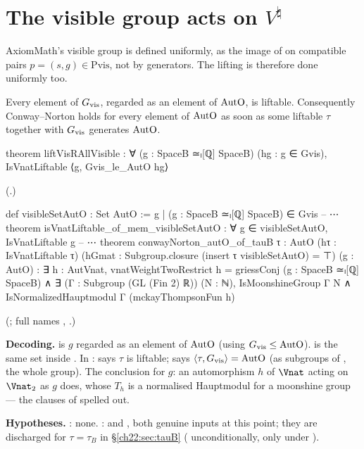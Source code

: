 \section{The visible group acts on \texorpdfstring{$V^\natural$}{V-natural}}\label{ch22:sec:visible}

AxiomMath's visible group is defined uniformly, as the image of  on compatible pairs
$p=(s,g)\in\mathrm{Pvis}$, not by generators.  The lifting is therefore done uniformly too.

\begin{theorem}\label{ch22:thm:visible}
Every element of $G_{\mathrm{vis}}$, regarded as an element of $\mathrm{AutO}$, is liftable.  Consequently
Conway--Norton holds for every element of $\mathrm{AutO}$ as soon as some liftable $\tau$ together with
$G_{\mathrm{vis}}$ generates $\mathrm{AutO}$.
\end{theorem}
\begin{leancode}
theorem liftVisRAllVisible : ∀ (g : SpaceB ≃ₗ[ℚ] SpaceB) (hg : g ∈ Gvis),
    IsVnatLiftable ⟨g, Gvis_le_AutO hg⟩
\end{leancode}
(.)
\begin{leancode}
def visibleSetAutO : Set AutO := {g | (g : SpaceB ≃ₗ[ℚ] SpaceB) ∈ Gvis}
-- ⋯
theorem isVnatLiftable_of_mem_visibleSetAutO : ∀ g ∈ visibleSetAutO, IsVnatLiftable g
-- ⋯
theorem conwayNorton_autO_of_tauB {τ : AutO} (hτ : IsVnatLiftable τ)
    (hGmat : Subgroup.closure (insert τ visibleSetAutO) = ⊤) (g : AutO) :
    ∃ h : AutVnat, vnatWeightTwoRestrict h = griessConj (g : SpaceB ≃ₗ[ℚ] SpaceB) ∧
      ∃ (Γ : Subgroup (GL (Fin 2) ℝ)) (N : ℕ), IsMoonshineGroup Γ N ∧
        IsNormalizedHauptmodul Γ (mckayThompsonFun h)
\end{leancode}
(; full names ,
.)
\begin{dictionary}
\textbf{Decoding.}   is $g$ regarded as an element of $\mathrm{AutO}$ (using
$G_{\mathrm{vis}}\le\mathrm{AutO}$).   is the same set inside .  In
:  says $\tau$ is liftable;  says
$\langle\tau,G_{\mathrm{vis}}\rangle=\mathrm{AutO}$ (as subgroups of ,  the whole group).  The
conclusion for $g$: an automorphism $h$ of $\Vnat$ acting on $\Vnat_2$ as $g$ does, whose $T_h$ is a normalised
Hauptmodul for a moonshine group --- the clauses of  spelled out.

\textbf{Hypotheses.}  : none.  :  and
, both genuine inputs at this point; they are discharged for $\tau=\tau_B$ in \S\ref{ch22:sec:tauB}
( unconditionally,  only under ).
\end{dictionary}
